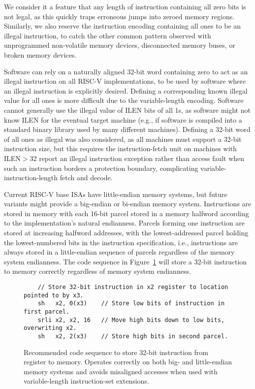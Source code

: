 \begin{commentary}
We consider it a feature that any length of instruction containing all
zero bits is not legal, as this quickly traps erroneous jumps into
zeroed memory regions. Similarly, we also reserve the instruction
encoding containing all ones to be an illegal instruction, to catch
the other common pattern observed with unprogrammed non-volatile
memory devices, disconnected memory buses, or broken memory devices.

Software can rely on a naturally aligned 32-bit word containing zero
to act as an illegal instruction on all RISC-V implementations, to be
used by software where an illegal instruction is explicitly desired.
Defining a corresponding known illegal value for all ones is more
difficult due to the variable-length encoding.  Software cannot
generally use the illegal value of ILEN bits of all 1s, as software
might not know ILEN for the eventual target machine (e.g., if software
is compiled into a standard binary library used by many different
machines).  Defining a 32-bit word of all ones as illegal was also
considered, as all machines must support a 32-bit instruction size,
but this requires the instruction-fetch unit on machines with
ILEN$>$32 report an illegal instruction exception rather than access
fault when such an instruction borders a protection boundary,
complicating variable-instruction-length fetch and decode.
\end{commentary}

Current RISC-V base ISAs have little-endian memory systems, but
future variants might provide a big-endian or bi-endian memory
system.  Instructions are stored in memory with each 16-bit parcel
stored in a memory halfword according to the implementation's natural
endianness. Parcels forming one instruction are stored at
increasing halfword addresses, with the lowest-addressed parcel
holding the lowest-numbered bits in the instruction specification,
i.e., instructions are always stored in a little-endian sequence of
parcels regardless of the memory system endianness.  The code sequence
in Figure~\ref{fig:storeinstruction} will store a 32-bit instruction
to memory correctly regardless of memory system endianness.

\begin{figure}[ht]
\begin{verbatim}
    // Store 32-bit instruction in x2 register to location pointed to by x3.
    sh   x2, 0(x3)    // Store low bits of instruction in first parcel.
    srli x2, x2, 16   // Move high bits down to low bits, overwriting x2.
    sh   x2, 2(x3)    // Store high bits in second parcel.
\end{verbatim}
\caption{Recommended code sequence to store 32-bit instruction from register to
  memory.  Operates correctly on both big- and little-endian
  memory systems and avoids misaligned accesses when used with variable-length
  instruction-set extensions.}
\label{fig:storeinstruction}
\end{figure}

